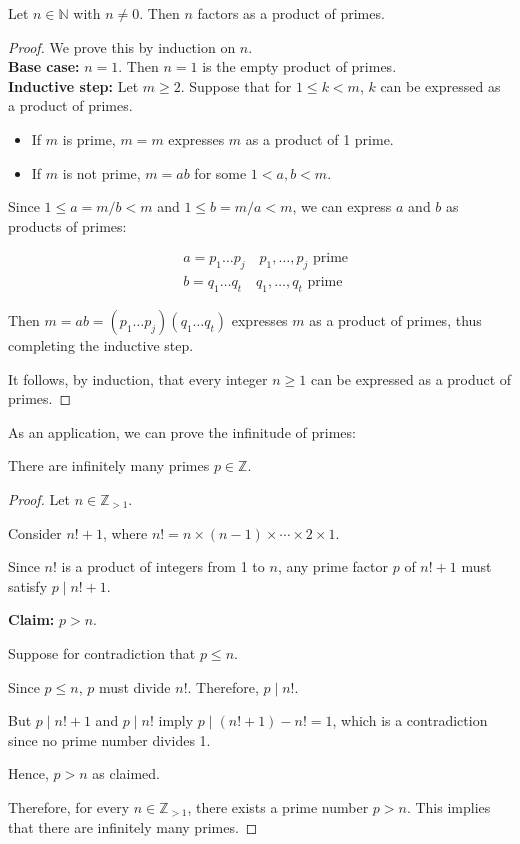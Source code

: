 \documentclass[11pt]{article}
\begin{document}
\begin{proposition} Let \(n \in \mathbb{N}\) with \(n \neq 0\). Then \(n\) factors as a product of primes.
\end{proposition}
\begin{proof}
    We prove this by induction on \(n\). \\
    \textbf{Base case:} \(n = 1\). Then \(n = 1\) is the empty product of primes.\\
    \textbf{Inductive step:} Let \(m \geq 2\). Suppose that for \(1 \leq k < m\), \(k\) can be expressed as a product of primes.

    \begin{itemize}
        \item If \(m\) is prime, \(m = m\) expresses \(m\) as a product of 1 prime.
        \item If \(m\) is not prime, \(m = ab\) for some \(1 < a, b < m\).
    \end{itemize}

    Since \(1 \leq a = m / b < m\) and \(1 \leq b = m / a < m\), we can express
    \(a\) and \(b\) as products of primes:

    \[
        \begin{aligned}
             & a = p_1 \ldots p_j \quad p_1, \ldots, p_j \text{ prime} \\
             & b = q_1 \ldots q_t \quad q_1, \ldots, q_t \text{ prime}
        \end{aligned}
    \]

    Then \(m = ab = (p_1 \ldots p_j)(q_1 \ldots q_t)\) expresses \(m\) as a product
    of primes, thus completing the inductive step.

    It follows, by induction, that every integer \(n \geq 1\) can be expressed as a
    product of primes.
\end{proof}
As an application, we can prove the infinitude of primes:

\begin{theorem}
    There are infinitely many primes \(p \in \mathbb{Z}\).
\end{theorem}

\begin{proof}
    Let \(n \in \mathbb{Z}_{>1}\).

    Consider \(n! + 1\), where \(n! = n \times (n-1) \times \cdots \times 2 \times
    1\).

    Since \(n!\) is a product of integers from 1 to \(n\), any prime factor \(p\)
    of \(n! + 1\) must satisfy \(p \mid n! + 1\).

    \textbf{Claim:} \(p > n\).

    Suppose for contradiction that \(p \leq n\).

    Since \(p \leq n\), \(p\) must divide \(n!\). Therefore, \(p \mid n!\).

    But \(p \mid n! + 1\) and \(p \mid n!\) imply \(p \mid (n! + 1) - n! = 1\),
    which is a contradiction since no prime number divides 1.

    Hence, \(p > n\) as claimed.

    Therefore, for every \(n \in \mathbb{Z}_{>1}\), there exists a prime number \(p
    > n\). This implies that there are infinitely many primes.
\end{proof}
\end{document}
